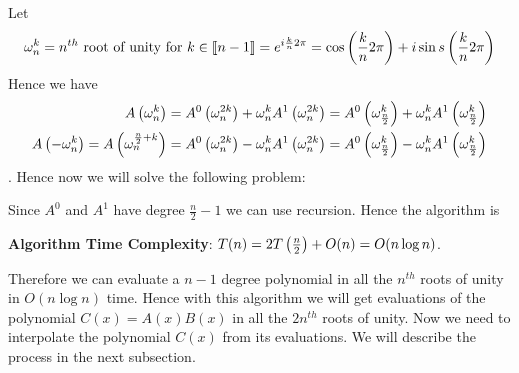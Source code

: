 Let $$\omega_n^k=n^{th}\text{ root of unity for }k\in\llbracket n-1\rrbracket = e^{i\frac{k}{n}2\pi}=\cos\left(\frac{k}{n}2\pi\right)+i\sin s\left(\frac{k}{n}2\pi\right)$$Hence we have \begin{align*}
	A\left(\omega_n^k\right)&=A^0\left(\omega_n^{2k}\right)+\omega_n^kA^1\left(\omega_n^{2k}\right)=A^0\left(\omega_{\frac{n}2}^{k}\right)+\omega_n^kA^1\left(\omega_{\frac{n}2}^{k}\right)\\
	A\left(-\omega_n^k\right)=A\left(\omega_n^{\frac{n}2+k}\right)&=A^0\left(\omega_n^{2k}\right)-\omega_n^kA^1\left(\omega_n^{2k}\right)=A^0\left(\omega_{\frac{n}2}^{k}\right)-\omega_n^kA^1\left(\omega_{\frac{n}2}^{k}\right)
\end{align*}. Hence now we will solve the following problem:
\begin{algoprob}
\end{algoprob}

\vspace*{5mm}\parinf
Since $A^0$ and $A^1$ have degree $\frac{n}2-1$ we can use recursion. Hence the algorithm is 
\begin{algorithm}
	\DontPrintSemicolon
		\caption{$(A)$}
	\end{algorithm}

\textbf{Algorithm Time Complexity}: $T(n)=2T\left(\frac{n}2\right)+O(n)=O(n\log n)$.\parinn

 Therefore we can evaluate a $n-1$ degree polynomial in all the $n^{th}$ roots of unity in $O(n\log n)$ time. Hence with this algorithm we will get evaluations of the polynomial $C(x)=A(x)B(x)$ in all the $2n^{th}$ roots of unity. Now we need to interpolate the polynomial $C(x)$ from its evaluations. We will describe the process in the next subsection.
